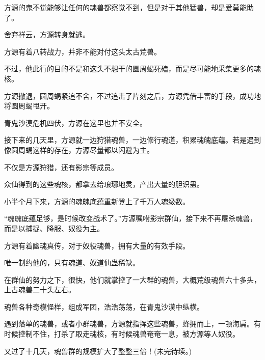 \begin{this_body}
方源的鬼不觉能够让任何的魂兽都察觉不到，但是对于其他猛兽，却是爱莫能助了。

舍弃祥云，方源转身就逃。

方源有着八转战力，并非不能对付这头太古荒兽。

不过，他此行的目的不是和这头不想干的圆周蝎死磕，而是尽可能地采集更多的魂核。

方源撤退，圆周蝎紧追不舍，不过追击了片刻之后，方源凭借丰富的手段，成功地将圆周蝎甩开。

青鬼沙漠危机四伏，方源在这里也并不安全。

接下来的几天里，方源就一边狩猎魂兽，一边修行魂道，积累魂魄底蕴。若是遇到像圆周蝎这样的存在，方源尽量都以闪避为主。

不仅是方源狩猎，还有影宗等成员。

众仙得到的这些魂核，都拿去给琅琊地灵，产出大量的胆识蛊。

小半个月下来，方源的魂魄底蕴重新登上了千万人魂级数。

“魂魄底蕴足够，是时候改变战术了。”方源嘱咐影宗群仙，接下来不再屠杀魂兽，而是以捕捉、降服、奴役为主。

方源有着幽魂真传，对于奴役魂兽，拥有大量的有效手段。

唯一制约他的，只有魂道、奴道仙蛊稀缺。

在群仙的努力之下，很快，他们就掌控了一大群的魂兽，大概荒级魂兽六十多头，上古魂兽二十头左右。

魂兽各种奇模怪样，组成军团，浩浩荡荡，在青鬼沙漠中纵横。

遇到落单的魂兽，或者小群魂兽，方源就指挥这些魂兽，蜂拥而上，一顿海扁。有时候控制不住，打杀了取走魂核，有时候魂兽奄奄一息，被方源等人奴役。

又过了十几天，魂兽群的规模扩大了整整三倍！(未完待续。)

\end{this_body}

